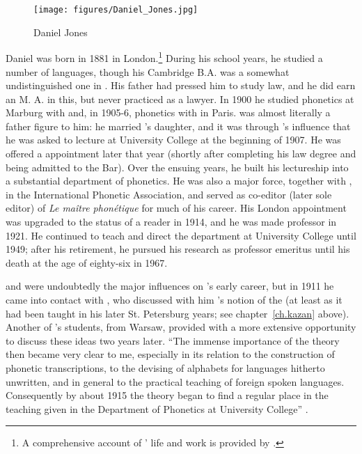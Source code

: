 \begin{wrapfigure}{r}{.35\textwidth}
  \texttt{[image: figures/Daniel\_Jones.jpg]}
  \caption{Daniel Jones}
  \label{fig:ch.firth.jones1}
\end{wrapfigure}
Daniel {\Jones} was born in 1881 in London.\footnote{A comprehensive account of
  ' life and work is provided by
  \citet{collins.mees99:jones}.} During his school years, he studied a
number of languages, though his Cambridge B.A. was a somewhat
undistinguished one in . His father had pressed him to
study law, and he did earn an M. A. in this, but never practiced as a
lawyer. In 1900 he studied  phonetics at Marburg with  and, in 1905-6,  phonetics with  in Paris. {\Passy}
was almost literally a father figure to him: he married {\Passy}'s
daughter, and it was through {\Passy}'s influence that he was asked to
lecture at University College at the beginning of 1907. He was offered
a  appointment later that year (shortly after completing his
law degree and being admitted to the Bar). Over the ensuing years, he
built his lectureship into a substantial department of phonetics. He
was also a major force, together with {\Passy}, in the International
Phonetic Association, and served as co-editor (later sole editor) of\textsl{ Le
maître phonétique} for much of his career. His London appointment was
upgraded to the status of a reader in 1914, and he was made professor
in 1921. He continued to teach and direct the department at University
College until 1949; after his retirement, he pursued his research as
professor emeritus until his death at the age of eighty-six in 1967.

{\Passy} and {\Sweet} were undoubtedly the major influences on {\Jones}'s early
career, but in 1911 he came into contact with {}, who discussed
with him {\DeCourtenay}'s notion of the  (at least as it
had been taught in his later St. Petersburg years; see
chapter~\ref{ch.kazan} above). Another of {\Baudouin}'s students, 
 from Warsaw, provided {\Jones} with a more extensive opportunity to
discuss these ideas two years later. ``The immense importance of the
theory then became very clear to me, especially in its relation to the
construction of phonetic transcriptions, to the devising of alphabets
for languages hitherto unwritten, and in general to the practical
teaching of foreign spoken languages. Consequently by about 1915 the
theory began to find a {regular} place in the teaching given in the
Department of Phonetics at University College''
\citep[6]{jones57:meaning.of.phoneme}.

